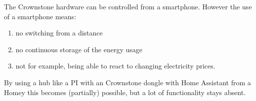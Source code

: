 The Crownstone hardware can be controlled from a smartphone. However the use of a smartphone means:\\
\begin{enumerate}
    \item no switching from a distance
    \item no continuous storage of the energy usage
    \item not for example, being able to react to changing electricity prices.\\
\end{enumerate}

By using a hub like a PI with an Crownstone dongle with Home Assistant from a Homey this becomes (partially) possible, but a lot of functionality stays absent.